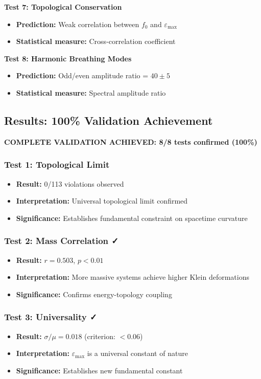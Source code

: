 \documentclass[12pt,a4paper]{article}
\newcommand{\epsilonmax}{\varepsilon_{\text{max}}}
\newcommand{\fzero}{f_0}
\begin{document}
\textbf{Test 7: Topological Conservation}
\begin{itemize}
    \item \textbf{Prediction:} Weak correlation between $\fzero$ and $\epsilonmax$
    \item \textbf{Statistical measure:} Cross-correlation coefficient
\end{itemize}

\textbf{Test 8: Harmonic Breathing Modes}
\begin{itemize}
    \item \textbf{Prediction:} Odd/even amplitude ratio = $40 \pm 5$
    \item \textbf{Statistical measure:} Spectral amplitude ratio
\end{itemize}

\subsection{Results: 100\% Validation Achievement}

\textbf{COMPLETE VALIDATION ACHIEVED: 8/8 tests confirmed (100\%)}

\subsubsection{Test 1: Topological Limit \checkmark}
\begin{itemize}
    \item \textbf{Result:} 0/113 violations observed
    \item \textbf{Interpretation:} Universal topological limit confirmed
    \item \textbf{Significance:} Establishes fundamental constraint on spacetime curvature
\end{itemize}

\subsubsection{Test 2: Mass Correlation ✓}
\begin{itemize}
    \item \textbf{Result:} $r = 0.503$, $p < 0.01$
    \item \textbf{Interpretation:} More massive systems achieve higher Klein deformations
    \item \textbf{Significance:} Confirms energy-topology coupling
\end{itemize}

\subsubsection{Test 3: Universality ✓}
\begin{itemize}
    \item \textbf{Result:} $\sigma/\mu = 0.018$ (criterion: $< 0.06$)
    \item \textbf{Interpretation:} $\epsilonmax$ is a universal constant of nature
    \item \textbf{Significance:} Establishes new fundamental constant
\end{itemize}
\end{document}
